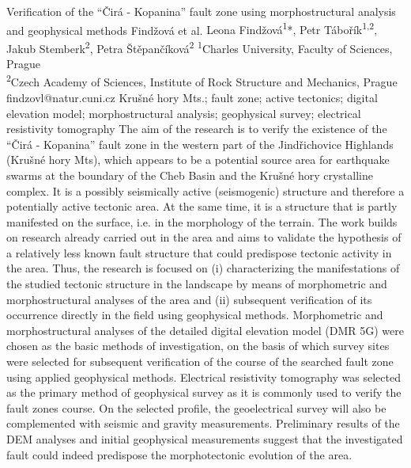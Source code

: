 \abstract
{Verification of the \enquote{Čirá - Kopanina} fault zone using morphostructural analysis and geophysical methods} %
{Findžová et al.} %
{Leona Findžová\textsuperscript{1}*, Petr Tábořík\textsuperscript{1,2}, Jakub Stemberk\textsuperscript{2}, Petra Štěpančíková\textsuperscript{2}} %
{\TLtag} %
{\textsuperscript{1}Charles University, Faculty of Sciences, Prague\\
\textsuperscript{2}Czech Academy of Sciences, Institute of Rock Structure and Mechanics, Prague
} %
{findzovl@natur.cuni.cz}  %
{Krušné hory Mts.; fault zone; active tectonics; digital elevation model; morphostructural analysis; geophysical survey; electrical resistivity tomography}%
{The aim of the research is to verify the existence of the \enquote{Čirá - Kopanina} fault zone in the western part of the Jindřichovice Highlands (Krušné hory Mts), which appears to be a potential source area for earthquake swarms at the boundary of the Cheb Basin and the Krušné hory crystalline complex. It is a possibly seismically active (seismogenic) structure and therefore a potentially active tectonic area. At the same time, it is a structure that is partly manifested on the surface, i.e. in the morphology of the terrain. The work builds on research already carried out in the area and aims to validate the hypothesis of a relatively less known fault structure that could predispose tectonic activity in the area. Thus, the research is focused on (i) characterizing the manifestations of the studied tectonic structure in the landscape by means of morphometric and morphostructural analyses of the area and (ii) subsequent verification of its occurrence directly in the field using geophysical methods. Morphometric and morphostructural analyses of the detailed digital elevation model (DMR 5G) were chosen as the basic methods of investigation, on the basis of which survey sites were selected for subsequent verification of the course of the searched fault zone using applied geophysical methods. Electrical resistivity tomography was selected as the primary method of geophysical survey as it is commonly used to verify the fault zones course. On the selected profile, the geoelectrical survey will also be complemented with seismic and gravity measurements. Preliminary results of the DEM analyses and initial geophysical measurements suggest that the investigated fault could indeed predispose the morphotectonic evolution of the area.
}%
{
}%

